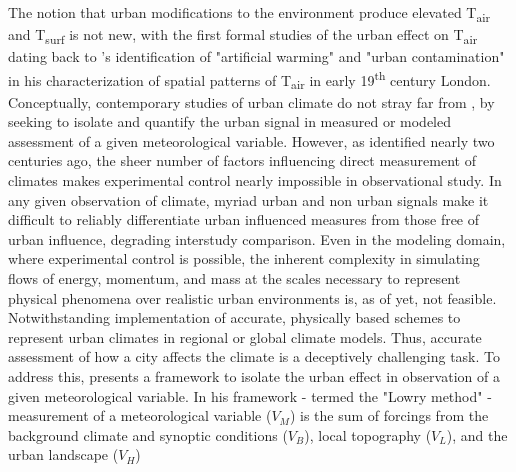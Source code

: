 \begin{bibunit}



The notion that urban modifications to the environment produce elevated T\textsubscript{air} and T\textsubscript{surf} is not new, with the first formal studies of the urban effect on T\textsubscript{air} dating back to \citet{Howard1833}'s identification of "artificial warming" and "urban contamination" in his characterization of spatial patterns of T\textsubscript{air} in early 19\textsuperscript{th} century London. Conceptually, contemporary studies of urban climate do not stray far from \citet{Howard1833}, by seeking to isolate and quantify the urban signal in measured or modeled assessment of a given meteorological variable. However, as \citet{Howard1833} identified nearly two centuries ago, the sheer number of factors influencing direct measurement of climates makes experimental control nearly impossible in observational study. In any given observation of climate, myriad urban and non urban signals make it difficult to reliably differentiate urban influenced measures from those free of urban influence, degrading interstudy comparison. Even in the modeling domain, where experimental control is possible, the inherent complexity in simulating flows of energy, momentum, and mass at the scales necessary to represent physical phenomena over realistic urban environments is, as of yet, not feasible. Notwithstanding implementation of accurate, physically based schemes to represent urban climates in regional or global climate models. Thus, accurate assessment of how a city affects the climate is a deceptively challenging task. To address this, \citet{Lowry1977} presents a framework to isolate the urban effect in observation of a given meteorological variable. In his framework - termed the "Lowry method" - measurement of a meteorological variable ($V_M$) is the sum of forcings from the background climate and synoptic conditions ($V_B$), local topography ($V_L$), and the urban landscape ($V_H$)


\end{bibunit}
